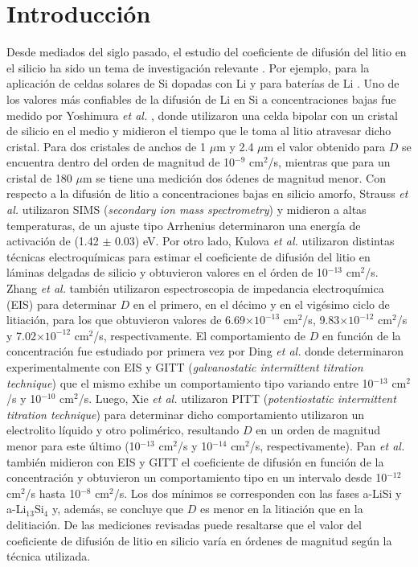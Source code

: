 \section{Introducción}

Desde mediados del siglo pasado, el estudio del coeficiente de difusión del litio
en el silicio ha sido un tema de investigación relevante \cite{fuller1953, 
pell1960}. Por ejemplo, para la aplicación de celdas solares de Si dopadas con Li 
\cite{larue1971} y para baterías de Li \cite{wen1981}. Uno de los valores 
más confiables de la difusión de Li en Si a concentraciones bajas fue medido por 
Yoshimura \textit{et al.} \cite{yoshimura2007}, donde utilizaron una celda bipolar 
con un cristal de silicio en el medio y midieron el tiempo que le toma al litio 
atravesar dicho cristal. Para dos cristales de anchos de 1 $\mu$m y 2.4 $\mu$m el 
valor obtenido para $D$ se encuentra dentro del orden de magnitud de 10$^{-9}$ 
cm$^2$/s, mientras que para un cristal de 180 $\mu$m se tiene una medición dos 
ódenes de magnitud menor. Con respecto a la difusión de litio a concentraciones 
bajas en silicio amorfo, Strauss \textit{et al.} \cite{strauss2018} utilizaron
SIMS (\textit{secondary ion mass spectrometry}) y midieron a altas temperaturas,
de un ajuste tipo Arrhenius determinaron una energía de activación de (1.42 $\pm$
0.03) eV. Por otro lado, Kulova \textit{et al.} \cite{kulova2007} utilizaron 
distintas técnicas electroquímicas para estimar el coeficiente de difusión del 
litio en láminas delgadas de silicio y obtuvieron valores en el órden de 
10$^{-13}$ cm$^2$/s. Zhang \textit{et al.} \cite{zhang2008} también utilizaron 
espectroscopia de impedancia electroquímica (EIS) para determinar $D$ en el 
primero, en el décimo y en el vigésimo ciclo de litiación, para los que obtuvieron 
valores de 6.69$\times 10^{-13}$ cm$^2$/s, 9.83$\times 10^{-12}$ cm$^2$/s y 
7.02$\times 10^{-12}$ cm$^2$/s, respectivamente. El comportamiento de $D$ en 
función de la concentración fue estudiado por primera vez por Ding \textit{et al.}
\cite{ding2009} donde determinaron experimentalmente con EIS y GITT 
(\textit{galvanostatic intermittent titration technique}) que el mismo exhibe un 
comportamiento tipo  variando entre 10$^{-13}$ cm$^2$/s y 10$^{-10}$ 
cm$^2$/s. Luego, Xie \textit{et al.} \cite{xie2010} utilizaron PITT 
(\textit{potentiostatic intermittent titration technique}) para determinar dicho
comportamiento utilizaron un electrolito líquido y otro polimérico, resultando $D$
en un orden de magnitud menor para este último (10$^{-13}$ cm$^2$/s y 10$^{-14}$ 
cm$^2$/s, respectivamente). Pan \textit{et al.} \cite{pan2019} también midieron
con EIS y GITT el coeficiente de difusión en función de la concentración y
obtuvieron un comportamiento tipo  en un intervalo desde 10$^{-12}$ 
cm$^2$/s hasta 10$^{-8}$ cm$^2$/s. Los dos mínimos se corresponden con las fases
a-LiSi y a-Li$_{13}$Si$_4$ y, además, se concluye que $D$ es menor en la litiación 
que en la delitiación. De las mediciones revisadas puede resaltarse que el valor 
del coeficiente de difusión de litio en silicio varía en órdenes de magnitud 
según la técnica utilizada.

